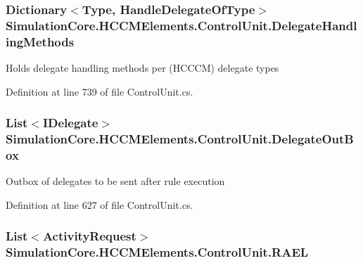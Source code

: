 \subsubsection[{\texorpdfstring{Delegate\+Handling\+Methods}{DelegateHandlingMethods}}]{\setlength{\rightskip}{0pt plus 5cm}Dictionary$<$Type, {\bf Handle\+Delegate\+Of\+Type}$>$ Simulation\+Core.\+H\+C\+C\+M\+Elements.\+Control\+Unit.\+Delegate\+Handling\+Methods\hspace{0.3cm}{\ttfamily [get]}}\hypertarget{class_simulation_core_1_1_h_c_c_m_elements_1_1_control_unit_a8d719d8dfcc990a419c52114097edf03}{}\label{class_simulation_core_1_1_h_c_c_m_elements_1_1_control_unit_a8d719d8dfcc990a419c52114097edf03}


Holds delegate handling methods per (H\+C\+C\+CM) delegate types 



Definition at line 739 of file Control\+Unit.\+cs.

\subsubsection[{\texorpdfstring{Delegate\+Out\+Box}{DelegateOutBox}}]{\setlength{\rightskip}{0pt plus 5cm}List$<${\bf I\+Delegate}$>$ Simulation\+Core.\+H\+C\+C\+M\+Elements.\+Control\+Unit.\+Delegate\+Out\+Box\hspace{0.3cm}{\ttfamily [get]}}\hypertarget{class_simulation_core_1_1_h_c_c_m_elements_1_1_control_unit_a450ff42f0a252ff4ef8f4b5c6f1e3fd7}{}\label{class_simulation_core_1_1_h_c_c_m_elements_1_1_control_unit_a450ff42f0a252ff4ef8f4b5c6f1e3fd7}


Outbox of delegates to be sent after rule execution 



Definition at line 627 of file Control\+Unit.\+cs.

\subsubsection[{\texorpdfstring{R\+A\+EL}{RAEL}}]{\setlength{\rightskip}{0pt plus 5cm}List$<${\bf Activity\+Request}$>$ Simulation\+Core.\+H\+C\+C\+M\+Elements.\+Control\+Unit.\+R\+A\+EL\hspace{0.3cm}{\ttfamily [get]}}\hypertarget{class_simulation_core_1_1_h_c_c_m_elements_1_1_control_unit_a9b5aa3d4737ceb8310badb24ce476169}{}\label{class_simulation_core_1_1_h_c_c_m_elements_1_1_control_unit_a9b5aa3d4737ceb8310badb24ce476169}


